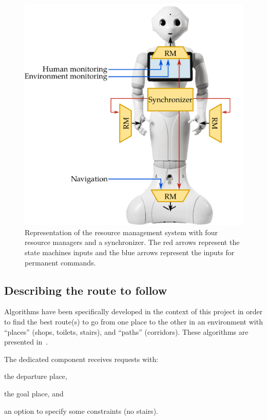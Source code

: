 \documentclass[a4paper,11pt,twoside]{StyleThese}
\begin{document}
\begin{figure}[!hb]
	\centering
	\includegraphics[scale=0.26]{figures/chapter3/rm.png}
	\caption{\label{fig:chap3_rm} Representation of the resource management system with four resource managers and a synchronizer. The red arrows represent the state machines inputs and the blue arrows represent the inputs for permanent commands.}
\end{figure}

\subsection{Describing the route to follow}\label{subsec:route_description}

Algorithms have been specifically developed in the context of this project in order to find the best route(s) to go from one place to the other in an environment with ``places'' (\eg shops, toilets, stairs), and ``paths'' (\eg corridors). These algorithms are presented in~\citep{sarthou_2019_semantic}. 

The dedicated component receives requests with:
\begin{inlineEnumerate}
	\item the departure place,
	\item the goal place, and
	\item an option to specify some constraints (\eg no stairs).
\end{inlineEnumerate}
\end{document}
